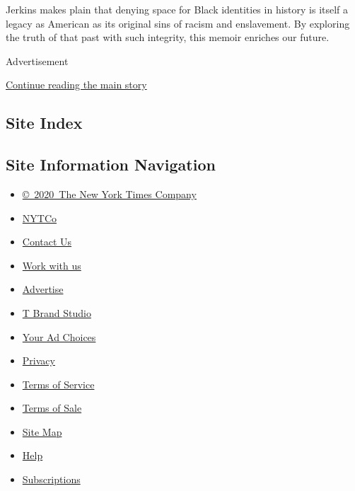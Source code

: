 Jerkins makes plain that denying space for Black identities in history
is itself a legacy as American as its original sins of racism and
enslavement. By exploring the truth of that past with such integrity,
this memoir enriches our future.

Advertisement

\protect\hyperlink{after-bottom}{Continue reading the main story}

\hypertarget{site-index}{%
\subsection{Site Index}\label{site-index}}

\hypertarget{site-information-navigation}{%
\subsection{Site Information
Navigation}\label{site-information-navigation}}

\begin{itemize}
\tightlist
\item
  \href{https://help.nytimes.com/hc/en-us/articles/115014792127-Copyright-notice}{©~2020~The
  New York Times Company}
\end{itemize}

\begin{itemize}
\tightlist
\item
  \href{https://www.nytco.com/}{NYTCo}
\item
  \href{https://help.nytimes.com/hc/en-us/articles/115015385887-Contact-Us}{Contact
  Us}
\item
  \href{https://www.nytco.com/careers/}{Work with us}
\item
  \href{https://nytmediakit.com/}{Advertise}
\item
  \href{http://www.tbrandstudio.com/}{T Brand Studio}
\item
  \href{https://www.nytimes.com/privacy/cookie-policy\#how-do-i-manage-trackers}{Your
  Ad Choices}
\item
  \href{https://www.nytimes.com/privacy}{Privacy}
\item
  \href{https://help.nytimes.com/hc/en-us/articles/115014893428-Terms-of-service}{Terms
  of Service}
\item
  \href{https://help.nytimes.com/hc/en-us/articles/115014893968-Terms-of-sale}{Terms
  of Sale}
\item
  \href{https://spiderbites.nytimes.com}{Site Map}
\item
  \href{https://help.nytimes.com/hc/en-us}{Help}
\item
  \href{https://www.nytimes.com/subscription?campaignId=37WXW}{Subscriptions}
\end{itemize}
